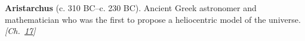 \textbf{Aristarchus} (c. 310 BC–c. 230 BC). Ancient Greek astronomer and mathematician who was the first to propose a heliocentric model of the universe. \emph{[Ch.~\hyperref[ch:bignumbers]{17}]}

